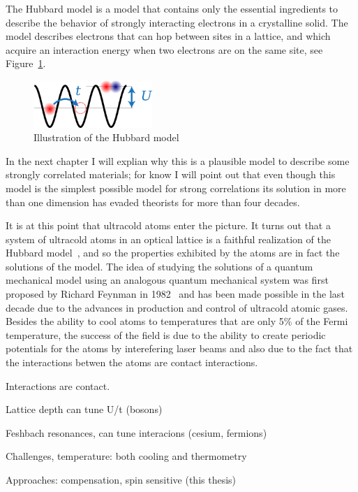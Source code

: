 \documentclass[oneside,11pt]{memoir}
\begin{document}
The Hubbard model is a model that contains only the essential ingredients
to describe the  behavior of strongly interacting electrons in a crystalline
solid.    The model describes electrons that can hop between sites in a
lattice, and which acquire an interaction energy when two electrons are on the
same site, see Figure~\ref{fig:chap01hubbard}.  
\begin{figure} \centering
\includegraphics[width=0.4\textwidth]{../figures/hubbard/little-hubbard.png}
\caption[Hubbard model]{\small Illustration of the Hubbard model }
\label{fig:chap01hubbard}
\end{figure}
In the next chapter I will explian why this is a plausible model to
describe some strongly correlated materials;  for know I will point out that
even though this model is the simplest possible model for strong correlations
its solution in more than one dimension has evaded theorists for more than four
decades.

It is at this point that ultracold atoms enter the picture.   It turns out that
a system of ultracold atoms in an optical lattice is a faithful realization of
the Hubbard model~\cite{PhysRevLett.81.3108}, and so the properties exhibited
by the atoms are in fact the solutions of the model.   The idea of studying the
solutions of a quantum mechanical model using an analogous quantum mechanical
system was first proposed by Richard Feynman in
1982~\cite{feynman1982simulating} and has been made possible in the last decade
due to the advances in production and control of ultracold atomic gases.
Besides the ability to cool atoms to temperatures that are only 5\% of the
Fermi temperature,   the success of the field is due to the ability to create
periodic potentials for the atoms by interefering laser beams and also due to
the fact that the interactions betwen the atoms are contact interactions.

Interactions are contact.   

Lattice depth can tune U/t  (bosons) 
 
Feshbach resonances, can tune interacions (cesium, fermions)  

Challenges, temperature:  both cooling and thermometry

Approaches:  compensation,  spin sensitive (this thesis)  
\end{document}
